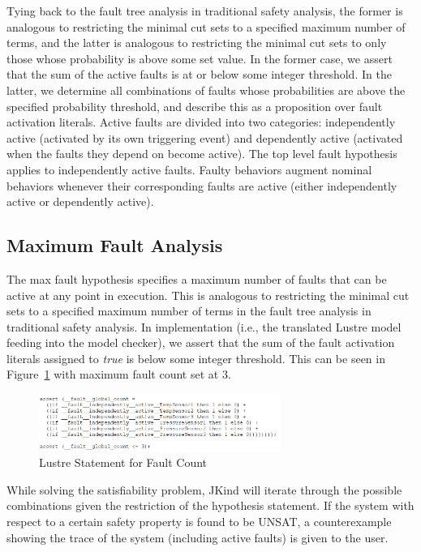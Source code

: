 Tying back to the fault tree analysis in traditional safety analysis, the former is analogous to restricting the minimal cut sets to a specified maximum number of terms, and the latter is analogous to restricting the minimal cut sets to only those whose probability is above some set value. In the former case, we assert that the sum of the active faults is at or below some integer threshold.  In the latter, we determine all combinations of faults whose probabilities are above the specified probability threshold, and describe this as a proposition over fault activation literals. 
%
Active faults are divided into two categories: independently active (activated by its own triggering event) and dependently active (activated when the faults they depend on become active). The top level fault hypothesis applies to independently active faults. Faulty behaviors augment nominal behaviors whenever their corresponding faults are active (either independently active or dependently active).

\subsection{Maximum Fault Analysis}
The max fault hypothesis specifies a maximum number of faults that can be active at any point in execution. This is analogous to restricting the minimal cut sets to a specified maximum number of terms in the fault tree analysis in traditional safety analysis. In implementation (i.e., the translated Lustre model feeding into the model checker), we assert that the sum of the fault activation literals assigned to \textit{true} is below some integer threshold. This can be seen in Figure~\ref{fig:count} with maximum fault count set at 3.
\begin{figure}[h]
	\begin{center}
		\includegraphics[width=0.7\textwidth]{images/assertCount.PNG}
	\end{center}
	\caption{Lustre Statement for Fault Count}
	\label{fig:count}
\end{figure}
While solving the satisfiability problem, JKind will iterate through the possible combinations given the restriction of the hypothesis statement. If the system with respect to a certain safety property is found to be UNSAT, a counterexample showing the trace of the system (including active faults) is given to the user. 

